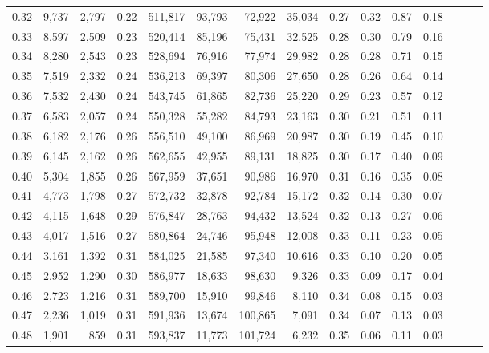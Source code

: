 \begin{tabular}{rrrrrrrrrrrrrrr}
0.32 &   9,737 &  2,797 &  0.22 &  511,817 &   93,793 &   72,922 &   35,034 &  0.27 &  0.32 &  0.87 &      0.18 \\
0.33 &   8,597 &  2,509 &  0.23 &  520,414 &   85,196 &   75,431 &   32,525 &  0.28 &  0.30 &  0.79 &      0.16 \\
0.34 &   8,280 &  2,543 &  0.23 &  528,694 &   76,916 &   77,974 &   29,982 &  0.28 &  0.28 &  0.71 &      0.15 \\
0.35 &   7,519 &  2,332 &  0.24 &  536,213 &   69,397 &   80,306 &   27,650 &  0.28 &  0.26 &  0.64 &      0.14 \\
0.36 &   7,532 &  2,430 &  0.24 &  543,745 &   61,865 &   82,736 &   25,220 &  0.29 &  0.23 &  0.57 &      0.12 \\
0.37 &   6,583 &  2,057 &  0.24 &  550,328 &   55,282 &   84,793 &   23,163 &  0.30 &  0.21 &  0.51 &      0.11 \\
0.38 &   6,182 &  2,176 &  0.26 &  556,510 &   49,100 &   86,969 &   20,987 &  0.30 &  0.19 &  0.45 &      0.10 \\
0.39 &   6,145 &  2,162 &  0.26 &  562,655 &   42,955 &   89,131 &   18,825 &  0.30 &  0.17 &  0.40 &      0.09 \\
0.40 &   5,304 &  1,855 &  0.26 &  567,959 &   37,651 &   90,986 &   16,970 &  0.31 &  0.16 &  0.35 &      0.08 \\
0.41 &   4,773 &  1,798 &  0.27 &  572,732 &   32,878 &   92,784 &   15,172 &  0.32 &  0.14 &  0.30 &      0.07 \\
0.42 &   4,115 &  1,648 &  0.29 &  576,847 &   28,763 &   94,432 &   13,524 &  0.32 &  0.13 &  0.27 &      0.06 \\
0.43 &   4,017 &  1,516 &  0.27 &  580,864 &   24,746 &   95,948 &   12,008 &  0.33 &  0.11 &  0.23 &      0.05 \\
0.44 &   3,161 &  1,392 &  0.31 &  584,025 &   21,585 &   97,340 &   10,616 &  0.33 &  0.10 &  0.20 &      0.05 \\
0.45 &   2,952 &  1,290 &  0.30 &  586,977 &   18,633 &   98,630 &    9,326 &  0.33 &  0.09 &  0.17 &      0.04 \\
0.46 &   2,723 &  1,216 &  0.31 &  589,700 &   15,910 &   99,846 &    8,110 &  0.34 &  0.08 &  0.15 &      0.03 \\
0.47 &   2,236 &  1,019 &  0.31 &  591,936 &   13,674 &  100,865 &    7,091 &  0.34 &  0.07 &  0.13 &      0.03 \\
0.48 &   1,901 &    859 &  0.31 &  593,837 &   11,773 &  101,724 &    6,232 &  0.35 &  0.06 &  0.11 &      0.03 \\

\end{tabular}

